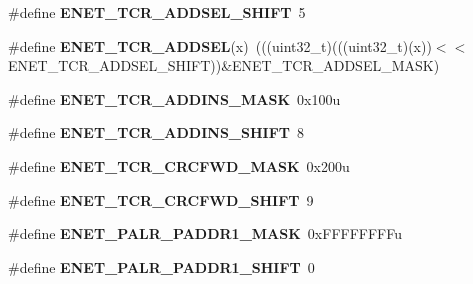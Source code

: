 \begin{DoxyCompactItemize}
\item 
\#define {\bfseries E\+N\+E\+T\+\_\+\+T\+C\+R\+\_\+\+A\+D\+D\+S\+E\+L\+\_\+\+S\+H\+I\+FT}~5\hypertarget{group__ENET__Register__Masks_ga1916110879ce7cd7c03a5aa919a26914}{}\label{group__ENET__Register__Masks_ga1916110879ce7cd7c03a5aa919a26914}

\item 
\#define {\bfseries E\+N\+E\+T\+\_\+\+T\+C\+R\+\_\+\+A\+D\+D\+S\+EL}(x)~(((uint32\+\_\+t)(((uint32\+\_\+t)(x))$<$$<$E\+N\+E\+T\+\_\+\+T\+C\+R\+\_\+\+A\+D\+D\+S\+E\+L\+\_\+\+S\+H\+I\+FT))\&E\+N\+E\+T\+\_\+\+T\+C\+R\+\_\+\+A\+D\+D\+S\+E\+L\+\_\+\+M\+A\+SK)\hypertarget{group__ENET__Register__Masks_ga6e0eea8e7474ee69a76c7d909b7e8217}{}\label{group__ENET__Register__Masks_ga6e0eea8e7474ee69a76c7d909b7e8217}

\item 
\#define {\bfseries E\+N\+E\+T\+\_\+\+T\+C\+R\+\_\+\+A\+D\+D\+I\+N\+S\+\_\+\+M\+A\+SK}~0x100u\hypertarget{group__ENET__Register__Masks_gaeb5338e8af454ab3ef6c6941db06157b}{}\label{group__ENET__Register__Masks_gaeb5338e8af454ab3ef6c6941db06157b}

\item 
\#define {\bfseries E\+N\+E\+T\+\_\+\+T\+C\+R\+\_\+\+A\+D\+D\+I\+N\+S\+\_\+\+S\+H\+I\+FT}~8\hypertarget{group__ENET__Register__Masks_ga0cecb548325189373066c8844f4d9bc4}{}\label{group__ENET__Register__Masks_ga0cecb548325189373066c8844f4d9bc4}

\item 
\#define {\bfseries E\+N\+E\+T\+\_\+\+T\+C\+R\+\_\+\+C\+R\+C\+F\+W\+D\+\_\+\+M\+A\+SK}~0x200u\hypertarget{group__ENET__Register__Masks_gad9cf76ede816b109e58a7ad51288ef8f}{}\label{group__ENET__Register__Masks_gad9cf76ede816b109e58a7ad51288ef8f}

\item 
\#define {\bfseries E\+N\+E\+T\+\_\+\+T\+C\+R\+\_\+\+C\+R\+C\+F\+W\+D\+\_\+\+S\+H\+I\+FT}~9\hypertarget{group__ENET__Register__Masks_ga3332e52d1af57a1516fcb08b76c128ee}{}\label{group__ENET__Register__Masks_ga3332e52d1af57a1516fcb08b76c128ee}

\item 
\#define {\bfseries E\+N\+E\+T\+\_\+\+P\+A\+L\+R\+\_\+\+P\+A\+D\+D\+R1\+\_\+\+M\+A\+SK}~0x\+F\+F\+F\+F\+F\+F\+F\+Fu\hypertarget{group__ENET__Register__Masks_gac4233569659da9e3d013421bd1e12b49}{}\label{group__ENET__Register__Masks_gac4233569659da9e3d013421bd1e12b49}

\item 
\#define {\bfseries E\+N\+E\+T\+\_\+\+P\+A\+L\+R\+\_\+\+P\+A\+D\+D\+R1\+\_\+\+S\+H\+I\+FT}~0\hypertarget{group__ENET__Register__Masks_gad11fbf90382ecfe565772e12e3997557}{}\label{group__ENET__Register__Masks_gad11fbf90382ecfe565772e12e3997557}


\end{DoxyCompactItemize}
